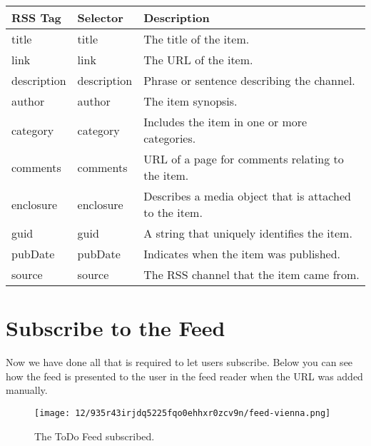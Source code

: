 \documentclass[a4paper,10pt,twoside]{book}
\newcommand{\ct}[1]{{\small\ttfamily\textup{#1}}}
\begin{document}
\begin{tabularx}{\textwidth}{llX}
\textbf{RSS Tag }&\textbf{Selector }&\textbf{Description}\\ \hline
 \ct{title} & \index{RRRssRenderCanvas!title} \ct{title} & The title of the item.\\
 \ct{link} & \index{RRRssRenderCanvas!link} \ct{link} & The URL of the item. \\
 \ct{description} & \index{RRRssRenderCanvas!description} \ct{description} & Phrase or sentence describing the channel.\\
 \ct{author} & \index{RRRssRenderCanvas!author} \ct{author} & The item synopsis.\\
 \ct{category} & \index{RRRssRenderCanvas!category} \ct{category} & Includes the item in one or more categories.\\
 \ct{comments} & \index{RRRssRenderCanvas!comments} \ct{comments} & URL of a page for comments relating to the item.\\
 \ct{enclosure} & \index{RRRssRenderCanvas!enclosure} \ct{enclosure} & Describes a media object that is attached to the item.\\
 \ct{guid} & \index{RRRssRenderCanvas!guid} \ct{guid} & A string that uniquely identifies the item.\\
 \ct{pubDate} & \index{RRRssRenderCanvas!pubDate} \ct{pubDate} & Indicates when the item was published.\\
 \ct{source} & \index{RRRssRenderCanvas!source} \ct{source} & The RSS channel that the item came from.\\
\end{tabularx}

\section{Subscribe to the Feed}
\label{book:web20:rss:subscribefeed}

Now we have done all that is required to let users subscribe. Below you can see how the feed is presented to the user in the feed reader when the URL was added manually.

\begin{figure}[h!tbp]
	\begin{center}
		\texttt{[image: 12/935r43irjdq5225fqo0ehhxr0zcv9n/feed-vienna.png]}
		\caption{The ToDo Feed subscribed.\label{book:web20:rss:subscribefeed:feedvienna}}
	\end{center}
\end{figure}
\end{document}
